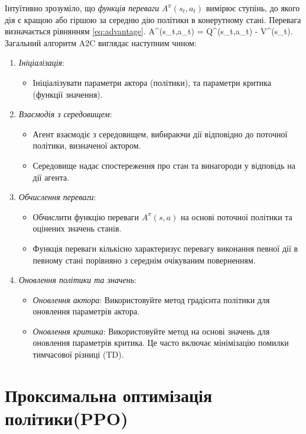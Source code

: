 Інтуїтивно зрозуміло, що {\em функція переваги} $A^{\pi}(s_t,a_t)$ вимірює ступінь, до якого дія є кращою або 
гіршою за середню дію політики в конерутному стані. Перевага визначається рівнянням \ref{eq:advantage}.
 A^{\pi}(s_t,a_t) = Q^{\pi}(s_t,a_t) - V^{\pi}(s_t). \eq \\
Загальний алгоритм A2C виглядає наступним чином:
\begin{enumerate}
  \item \emph{Ініціалізація}: 
  \begin{itemize}
      \item Ініціалізувати параметри актора (політики), та параметри критика (функції значення).
  \end{itemize}
  
  \item \emph{Взаємодія з середовищем}:
  \begin{itemize}
      \item Агент взаємодіє з середовищем, вибираючи дії відповідно до поточної політики, визначеної актором.
      \item Середовище надає спостереження про стан та винагороди у відповідь на дії агента.
  \end{itemize}
  
  \item \emph{Обчислення переваги}:
  \begin{itemize}
      \item Обчислити функцію переваги $A^{\pi}(s,a)$ на основі поточної політики та оцінених значень станів.
      \item Функція переваги кількісно характеризує перевагу виконання певної дії в певному стані порівняно з середнім очікуваним поверненням.
  \end{itemize}
  
  \item \emph{Оновлення політики та значень}:
  \begin{itemize}

      \item \emph{Оновлення актора}: Використовуйте метод градієнта політики для оновлення параметрів актора.
      \item \emph{Оновлення критика}: Використовуйте метод на основі значень для оновлення параметрів критика. Це часто включає мінімізацію помилки тимчасової різниці (TD). 
  \end{itemize}
\end{enumerate}

\section{Проксимальна оптимізація політики(PPO)}

